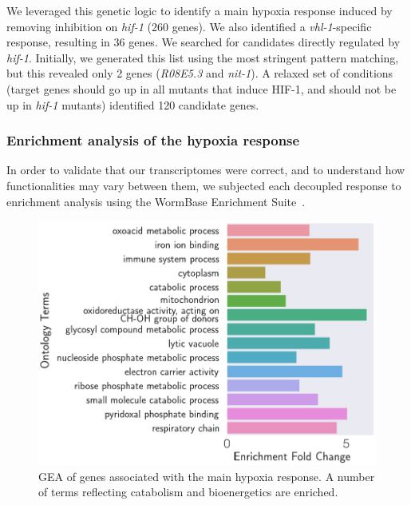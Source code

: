 \documentclass[9pt,twocolumn,twoside]{pnas-new}
\newcommand{\vhl}{\emph{vhl-1}}
\newcommand{\hif}{\emph{hif-1}}
\newcommand{\hifp}{HIF-1}
\newcommand{\vhltargets}{36}
\newcommand{\hiftargets}{120}
\begin{document}
We leveraged this genetic logic to identify a main hypoxia
response induced by removing inhibition on \hif{} (260 genes). We also
identified a \vhl{}-specific response, resulting in \vhltargets{}
genes. We searched for candidates directly regulated by \hif{}.
Initially, we generated this list using the most stringent pattern
matching, but this revealed only 2 genes (\emph{R08E5.3} and
\emph{nit-1}). A relaxed set of conditions (target genes should go up in all
mutants that induce \hifp{}, and should not be up in \hif{} mutants) identified
\hiftargets{} candidate genes.

\subsubsection*{Enrichment analysis of the hypoxia response}
\label{sub:ea_hypoxia}
In order to validate that our transcriptomes were correct, and to understand how
functionalities may vary between them, we subjected each decoupled response to
enrichment analysis using the WormBase Enrichment
Suite~\cite{Angeles-Albores2016}.

\begin{figure}[tbhp]
\centering
\includegraphics[width=\linewidth]{figs/hypoxia_response_gea.pdf}
\caption{
GEA of genes associated with the main hypoxia response. A number of terms
reflecting catabolism and bioenergetics are enriched.
}
\label{fig:hyp_gea}
\end{figure}
\end{document}
